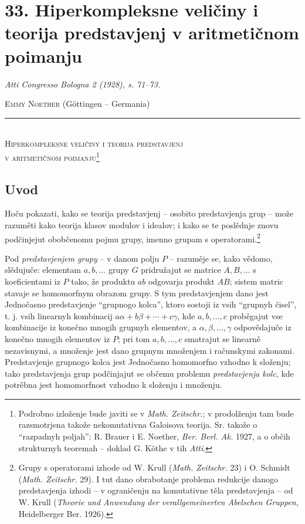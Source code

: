 \documentclass[11pt]{article}
\begin{document}
\section*{33. Hiperkompleksne veličiny i teorija predstavjenj v aritmetičnom poimanju}
\emph{Atti Congresso Bologna 2 (1928), s. 71--73.}

\begin{center}
\textsc{Emmy Noether} (Göttingen -- Germania)\\[-0.1em]
\rule{3em}{0.4pt}\\[0.8em]
\textsc{Hiperkompleksne veličiny i teorija predstavjenj}\\
\textsc{v aritmetičnom poimanju}\footnote{Podrobno izloženje bude javiti se v \emph{Math. Zeitschr.}; v prodolženju tam bude razsmotrjena takože nekomutativna Galoisova teorija. Sr. takože o “razpadnyh poljah”: R. Brauer i E. Noether, \emph{Ber. Berl. Ak.} 1927, a o občih strukturnyh teoremah -- doklad G. Köthe v tih \emph{Atti}.}
\end{center}

\subsection*{Uvod}

Hoču pokazati, kako se teorija predstavjenj -- osobito predstavjenja grup -- može razuměti kako teorija klasov modulov i idealov; i kako se te poslědnje znovu podčinjejut obobčenomu pojmu grupy, imenno grupam s operatorami.\footnote{Grupy s operatorami izhode od W. Krull (\emph{Math. Zeitschr.} 23) i O. Schmidt (\emph{Math. Zeitschr.} 29). I tut dano obrabotanje problema redukcije danogo predstavjenja izhodi -- v ograničenju na komutativne těla predstavjenja -- od W. Krull (\emph{Theorie und Anwendung der verallgemeinerten Abelschen Gruppen}, Heidelberger Ber. 1926).}

Pod \emph{predstavjenjem grupy} -- v danom polju $P$ -- razuměje se, kako vědomo, slědujuče: elementam $a,b,\ldots$ grupy $G$ pridružajut se matrice $A,B,\ldots$ s koeficientami iz $P$ tako, že produktu $ab$ odgovarja produkt $AB$; sistem matric stavaje se homomorfnym obrazom grupy. S tym predstavjenjem dano jest Jednočasno predstavjenje “grupnogo kolca”, ktoro sostoji iz vsih “grupnyh čisel”, t. j. vsih linearnyh kombinacij $a\alpha+b\beta+\cdots+c\gamma$, kde $a,b,\ldots,c$ proběgajut vse kombinacije iz konečno mnogih grupnyh elementov, a $\alpha,\beta,\ldots,\gamma$ odpovědajuče iz konečno mnogih elementov iz $P$; pri tom $a,b,\ldots,c$ smatrajut se linearně nezavisnymi, a množenje jest dano grupnym množenjem i računskymi zakonami. Predstavjenje grupnogo kolca jest Jednočasno homomorfno vzhodno k složenju; tako predstavjenja grup podčinjajut se občemu problemu \emph{predstavjenja kolc}, kde potrěbna jest homomorfnost vzhodno k složenju i množenju.
\end{document}
